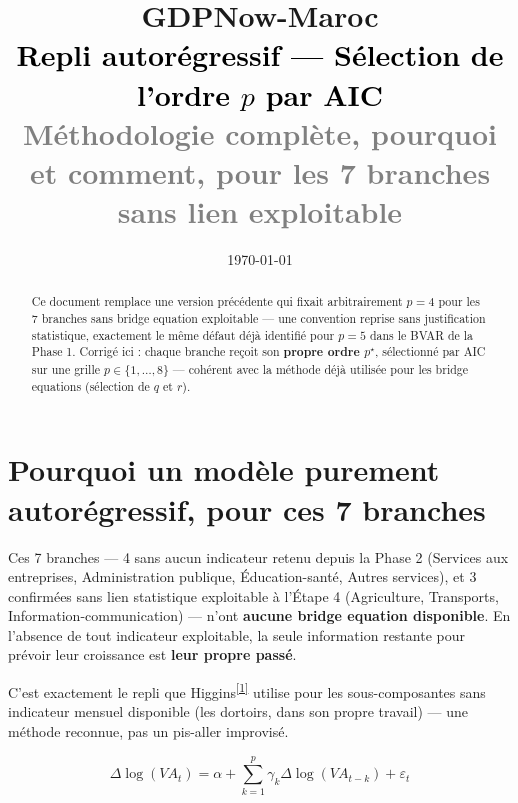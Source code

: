 \documentclass[11pt,a4paper]{article}
\title{\vspace{-1.3cm}\textcolor{bleuprincip}{\Huge\bfseries GDPNow-Maroc}\\[0.3cm]
\textcolor{black}{\Large Repli autorégressif --- Sélection de l'ordre $p$ par AIC}\\[0.15cm]
\textcolor{gray}{\large Méthodologie complète, pourquoi et comment, pour les 7 branches sans lien exploitable}}
\author{}
\date{\today}
\newcommand{\cit}[1]{\textsuperscript{\hyperlink{ref#1}{[#1]}}}
\begin{document}
\maketitle
\thispagestyle{empty}

\begin{abstract}
\noindent Ce document remplace une version précédente qui fixait arbitrairement $p=4$ pour les 7 branches sans bridge equation exploitable --- une convention reprise sans justification statistique, exactement le même défaut déjà identifié pour $p=5$ dans le BVAR de la Phase 1. Corrigé ici : chaque branche reçoit son \textbf{propre ordre $p^\star$}, sélectionné par AIC sur une grille $p\in\{1,\dots,8\}$ --- cohérent avec la méthode déjà utilisée pour les bridge equations (sélection de $q$ et $r$).
\end{abstract}

\tableofcontents
\vspace{0.5cm}

\section{Pourquoi un modèle purement autorégressif, pour ces 7 branches}

\begin{intuition}
Ces 7 branches --- 4 sans aucun indicateur retenu depuis la Phase 2 (Services aux entreprises, Administration publique, Éducation-santé, Autres services), et 3 confirmées sans lien statistique exploitable à l'Étape 4 (Agriculture, Transports, Information-communication) --- n'ont \textbf{aucune bridge equation disponible}. En l'absence de tout indicateur exploitable, la seule information restante pour prévoir leur croissance est \textbf{leur propre passé}.
\end{intuition}

C'est exactement le repli que Higgins\cit{1} utilise pour les sous-composantes sans indicateur mensuel disponible (les dortoirs, dans son propre travail) --- une méthode reconnue, pas un pis-aller improvisé.

\begin{equation}
\Delta\log(VA_t) = \alpha + \sum_{k=1}^{p}\gamma_k \Delta\log(VA_{t-k}) + \varepsilon_t
\label{eq:ar_p}
\end{equation}

\end{document}
